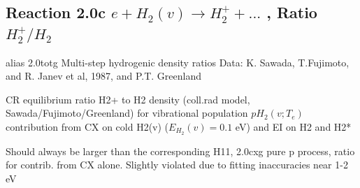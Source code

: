 \documentclass[12pt,dvipdfmx]{article}
\begin{document}
\subsection{
Reaction 2.0c   $e +  H_2(v) \rightarrow H_2^+ + ... $ , Ratio \ $H_2^+/H_2$
}
alias 2.0totg
 Multi-step hydrogenic density ratios
 Data: K. Sawada, T.Fujimoto, \cite{kn:Sawada} and R. Janev et al, 1987, and P.T. Greenland


  CR equilibrium ratio H2+ to H2 density
  (coll.rad model, Sawada/Fujimoto/Greenland) for vibrational population $pH_2(v;T_e)$
  contribution from CX on cold H2(v) ($E_{H_2}(v)=0.1$ eV) and EI on H2 and H2*


Should always be larger than the corresponding H11, 2.0cxg pure p process, ratio for contrib. from CX alone.
Slightly violated due to fitting inaccuracies near 1-2 eV
\end{document}
